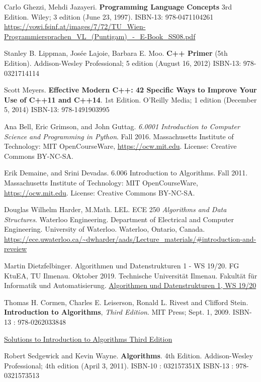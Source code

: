 \documentclass[10pt]{amsart}
\begin{document}
\begin{thebibliography}{9}
Carlo Ghezzi, Mehdi Jazayeri.  \textbf{Programming Language Concepts} 3rd Edition.  Wiley; 3 edition (June 23, 1997).  ISBN-13: 978-0471104261  \url{https://vowi.fsinf.at/images/7/72/TU_Wien-Programmiersprachen_VL_(Puntigam)_-_E-Book_SS08.pdf}

Stanley B. Lippman, Jos\'{e}e Lajoie, Barbara E. Moo. \textbf{C++ Primer} (5th Edition).  Addison-Wesley Professional; 5 edition (August 16, 2012) ISBN-13: 978-0321714114 

Scott Meyers.  \textbf{Effective Modern C++: 42 Specific Ways to Improve Your Use of C++11 and C++14}. 1st Edition.  O'Reilly Media; 1 edition (December 5, 2014)  ISBN-13: 978-1491903995

Ana Bell, Eric Grimson, and John Guttag. \emph{6.0001 Introduction to Computer Science and Programming in Python}. Fall 2016. Massachusetts Institute of Technology: MIT OpenCourseWare, \url{https://ocw.mit.edu}. License: Creative Commons BY-NC-SA.


Erik Demaine, and Srini Devadas. 6.006 Introduction to Algorithms. Fall 2011. Massachusetts Institute of Technology: MIT OpenCourseWare, \url{https://ocw.mit.edu}. License: Creative Commons BY-NC-SA.

Douglas Wilhelm Harder, M.Math. LEL. ECE 250 \emph{Algorithms and Data Structures}. Waterloo Engineering. Department of Electrical and Computer Engineering. University of Waterloo. Waterloo, Ontario, Canada. \url{https://ece.uwaterloo.ca/~dwharder/aads/Lecture_materials/#introduction-and-reveiew}

Martin Dietzfelbinger. Algorithmen und Datenstrukturen 1 - WS 19/20. FG KtuEA, TU Ilmenau. Oktober 2019. Technische Universit\"{a}t Ilmenau. Fakult\"{a}t f\"{u}r Informatik und Automatisierung. \href{https://www.tu-ilmenau.de/en/institute-of-theoretical-computer-science/lehre/lehre-ws-20192020/aud-1/}{Algorithmen und Datenstrukturen 1, WS 19/20}


Thomas H. Cormen, Charles E. Leiserson, Ronald L. Rivest and Clifford Stein.  \textbf{Introduction to Algorithms}, \emph{Third Edition}. MIT Press; Sept. 1, 2009.  ISBN-13 : 978-0262033848 

\href{https://walkccc.me/CLRS/}{Solutions to Introduction to Algorithms Third Edition}

Robert Sedgewick and Kevin Wayne. \textbf{Algorithms}. 4th Edition. Addison-Wesley Professional; 4th edition (April 3, 2011). ISBN-10 : 032157351X
ISBN-13 : 978-0321573513 


\end{thebibliography}
\end{document}
